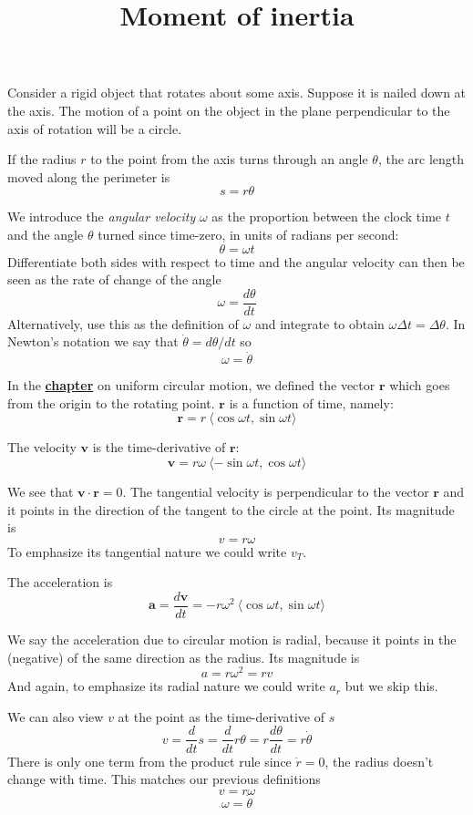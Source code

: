 \documentclass[11pt, oneside]{article}
\title{Moment of inertia}
\date{}
\begin{document}
\maketitle
\Large

Consider a rigid object that rotates about some axis.  Suppose it is nailed down at the axis.  The motion of a point on the object in the plane perpendicular to the axis of rotation will be a circle.

If the radius $r$ to the point from the axis turns through an angle $\theta$, the arc length moved along the perimeter is
\[ s = r \theta \]

We introduce the \emph{angular velocity} $\omega$ as the proportion between the clock time $t$ and the angle $\theta$ turned since time-zero, in units of radians per second:
\[ \theta = \omega t \]
Differentiate both sides with respect to time and the angular velocity can then be seen as the rate of change of the angle
\[ \omega = \frac{d \theta}{dt} \]
Alternatively, use this as the definition of $\omega$ and integrate to obtain $\omega \Delta t = \Delta \theta$.
In Newton's notation we say that $\dot{\theta} = d \theta/dt$ so
\[ \omega = \dot{\theta} \]

In the \hyperref[sec:Uniform_circular_motion]{\textbf{chapter}} on uniform circular motion, we defined the vector $\mathbf{r}$ which goes from the origin to the rotating point.  $\mathbf{r}$ is a function of time, namely:
\[ \mathbf{r} = r \ \langle \cos \omega t, \sin \omega t \rangle \]

The velocity $\mathbf{v}$ is the time-derivative of $\mathbf{r}$:
\[ \mathbf{v} = r \omega \ \langle -\sin \omega t, \cos \omega t \rangle \]

We see that $\mathbf{v} \cdot \mathbf{r} = 0$.  The tangential velocity is perpendicular to the vector $\mathbf{r}$ and it points in the direction of the tangent to the circle at the point.  Its magnitude is
\[ v = r \omega \]
To emphasize its tangential nature we could write $v_T$.

The acceleration is
\[ \mathbf{a} = \frac{d \mathbf{v}}{dt} = -r\omega^2 \ \langle \cos \omega t, \sin \omega t \rangle \]

We say the acceleration due to circular motion is radial, because it points in the (negative) of the same direction as the radius.  Its magnitude is
\[ a = r \omega^2 = r v \]
And again, to emphasize its radial nature we could write $a_r$ but we skip this.

We can also view $v$ at the point as the time-derivative of $s$
\[ v = \frac{d}{dt} s = \frac{d}{dt} r \theta = r \frac{d \theta}{dt} = r \dot{\theta} \]
There is only one term from the product rule since $\dot{r} = 0$, the radius doesn't change with time.  This matches our previous definitions
\[ v = r \omega \]
\[ \omega = \dot{\theta} \]
\end{document}
